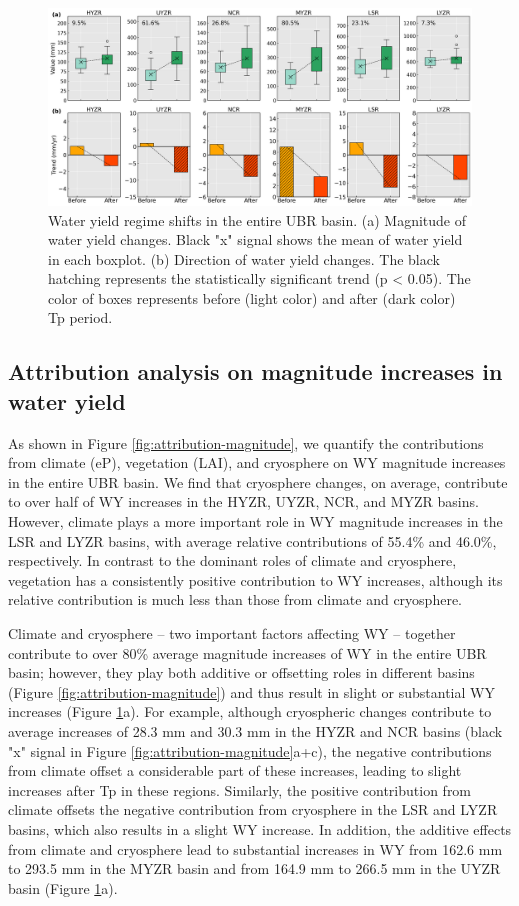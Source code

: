 \documentclass[hess, manuscript]{copernicus}
\begin{document}
\begin{figure}[ht]
    \includegraphics[width=\textwidth]{02-figures/magnitude_and_direction.png}
    \caption
    {Water yield regime shifts in the entire UBR basin. (a) Magnitude of water yield changes. Black "x" signal shows the mean of water yield in each boxplot. (b) Direction of water yield changes. The black hatching represents the statistically significant trend (p < 0.05). The color of boxes represents before (light color) and after (dark color) Tp period.}
    \label{fig:magnitude-direction}
\end{figure}

\subsection{Attribution analysis on magnitude increases in water yield}
As shown in Figure \ref{fig:attribution-magnitude}, we quantify the contributions from climate (eP), vegetation (LAI), and cryosphere on WY magnitude increases in the entire UBR basin. We find that cryosphere changes, on average, contribute to over half of WY increases in the HYZR, UYZR, NCR, and MYZR basins. However, climate plays a more important role in WY magnitude increases in the LSR and LYZR basins, with average relative contributions of 55.4\% and 46.0\%, respectively. In contrast to the dominant roles of climate and cryosphere, vegetation has a consistently positive contribution to WY increases, although its relative contribution is much less than those from climate and cryosphere.

Climate and cryosphere -- two important factors affecting WY -- together contribute to over 80\% average magnitude increases of WY in the entire UBR basin; however, they play both additive or offsetting roles in different basins (Figure \ref{fig:attribution-magnitude}) and thus result in slight or substantial WY increases (Figure \ref{fig:magnitude-direction}a). For example, although cryospheric changes contribute to average increases of 28.3 mm and 30.3 mm in the HYZR and NCR basins (black "x" signal in Figure \ref{fig:attribution-magnitude}a+c), the negative contributions from climate offset a considerable part of these increases, leading to slight increases after Tp in these regions. Similarly, the positive contribution from climate offsets the negative contribution from cryosphere in the LSR and LYZR basins, which also results in a slight WY increase. In addition, the additive effects from climate and cryosphere lead to substantial increases in WY from 162.6 mm to 293.5 mm in the MYZR basin and from 164.9 mm to 266.5 mm in the UYZR basin (Figure \ref{fig:magnitude-direction}a).
\end{document}
